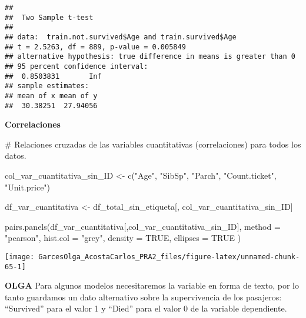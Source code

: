 \documentclass[
]{article}
\newenvironment{Shaded}{\begin{snugshade}}{\end{snugshade}}
\newcommand{\CommentTok}[1]{\textcolor[rgb]{0.50,0.62,0.50}{#1}}
\newcommand{\DataTypeTok}[1]{\textcolor[rgb]{0.87,0.87,0.75}{#1}}
\newcommand{\DecValTok}[1]{\textcolor[rgb]{0.86,0.86,0.80}{#1}}
\newcommand{\KeywordTok}[1]{\textcolor[rgb]{0.94,0.87,0.69}{#1}}
\newcommand{\NormalTok}[1]{\textcolor[rgb]{0.80,0.80,0.80}{#1}}
\newcommand{\OperatorTok}[1]{\textcolor[rgb]{0.94,0.94,0.82}{#1}}
\newcommand{\OtherTok}[1]{\textcolor[rgb]{0.94,0.94,0.56}{#1}}
\newcommand{\StringTok}[1]{\textcolor[rgb]{0.80,0.58,0.58}{#1}}
\begin{document}
\begin{verbatim}
## 
##  Two Sample t-test
## 
## data:  train.not.survived$Age and train.survived$Age
## t = 2.5263, df = 889, p-value = 0.005849
## alternative hypothesis: true difference in means is greater than 0
## 95 percent confidence interval:
##  0.8503831       Inf
## sample estimates:
## mean of x mean of y 
##  30.38251  27.94056
\end{verbatim}

\textbf{Correlaciones}

\begin{Shaded}
\begin{Highlighting}[]
\CommentTok{# Relaciones cruzadas de las variables cuantitativas (correlaciones) para todos los datos.}

\NormalTok{col_var_cuantitativa_sin_ID <-}\StringTok{ }\KeywordTok{c}\NormalTok{(}\StringTok{"Age"}\NormalTok{, }\StringTok{"SibSp"}\NormalTok{, }\StringTok{"Parch"}\NormalTok{, }\StringTok{"Count.ticket"}\NormalTok{, }\StringTok{"Unit.price"}\NormalTok{)}

\NormalTok{df_var_cuantitativa <-}\StringTok{ }\NormalTok{df_total_sin_etiqueta[, col_var_cuantitativa_sin_ID]}


\KeywordTok{pairs.panels}\NormalTok{(df_var_cuantitativa[,col_var_cuantitativa_sin_ID], }
             \DataTypeTok{method =} \StringTok{"pearson"}\NormalTok{, }
             \DataTypeTok{hist.col =} \StringTok{"grey"}\NormalTok{,}
             \DataTypeTok{density =} \OtherTok{TRUE}\NormalTok{,  }
             \DataTypeTok{ellipses =} \OtherTok{TRUE} 
\NormalTok{             )}
\end{Highlighting}
\end{Shaded}

\begin{center}\texttt{[image: GarcesOlga\_AcostaCarlos\_PRA2\_files/figure-latex/unnamed-chunk-65-1]} \end{center}

\textbf{OLGA} Para algunos modelos necesitaremos la variable en forma de
texto, por lo tanto guardamos un dato alternativo sobre la supervivencia
de los pasajeros: ``Survived'' para el valor 1 y ``Died'' para el valor
0 de la variable dependiente.

\begin{Shaded}
\end{Shaded}
\end{document}
